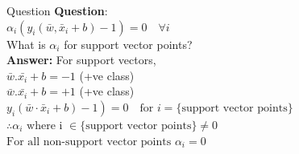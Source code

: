 \documentclass{beamer}
\begin{document}
\begin{frame}{Question}
\textbf{Question}:\\
\vspace{2mm}
$\alpha_{i}\left(y_{i}\left(\bar{w}, \bar{x}_{i}+b\right)-1\right)=0 \quad \forall i$\\
\vspace{2mm}
What is $\alpha_{i}$ for support vector points?\\
\vspace{4mm}
\textbf{Answer:}
For support vectors,\\
\hspace{1in}$\bar{w}.\bar{x_{i}} + b  = -1$ (+ve class)\\
\hspace{1in}$\bar{w}.\bar{x_{i}} + b  = +1$ (+ve class)\\
\vspace{2mm}
$\left.y_{i}\left(\bar{w} \cdot \bar{x}_{i}+b\right)-1\right)=0 \quad \text {for } i=\{\text{support vector points\}}$
$\therefore \alpha_{i} \text { where i } \in \text{\{support vector points\}} \neq 0$
\vspace{5mm}
$\text{For all non-support vector points }\alpha_{i} = 0$
\end{frame}
\end{document}
